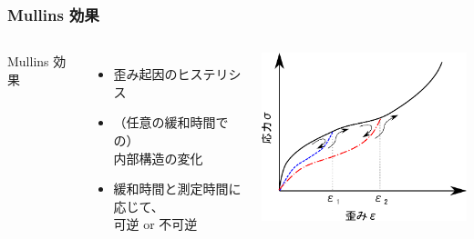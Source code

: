 \documentclass[11pt, dvipdfmx]{beamer}
\begin{document}
\begin{frame}
\frametitle{Mullins 効果}

\begin{columns}[totalwidth=1\textwidth]
Mullins 効果
	\begin{itemize}
		\item 歪み起因のヒステリシス
		\item （任意の緩和時間での）\\ \alert{内部構造の変化}
		\item 緩和時間と測定時間に\\応じて、\\{\color{red} 可逆} or 不可逆
	\end{itemize}
 \centering
	\includegraphics[width=65mm]{./fig/Mullins_Efct.pdf}
\end{columns}

\end{frame}
\end{document}
